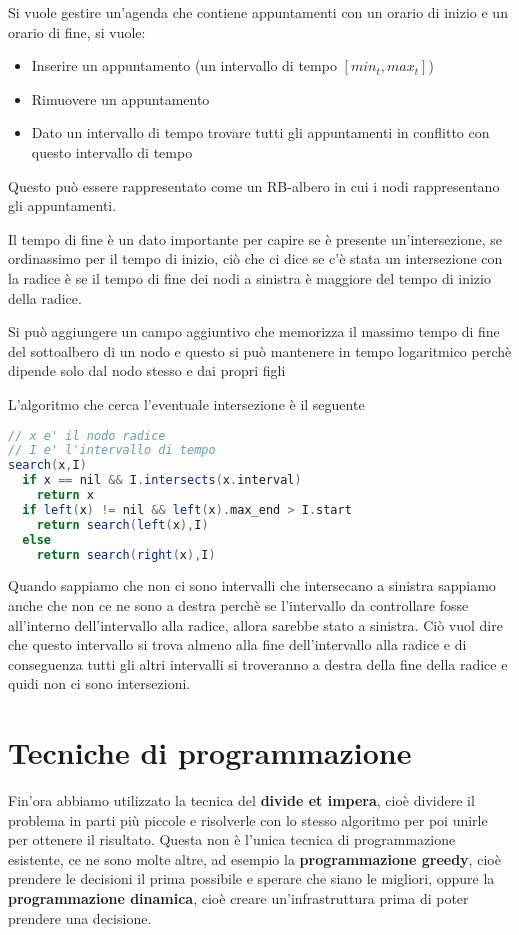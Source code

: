 \documentclass[a4paper]{article}
\begin{document}
\begin{exercise}
  Si vuole gestire un'agenda che contiene appuntamenti con un orario di inizio e un orario
  di fine, si vuole:
  \begin{itemize}
    \item Inserire un appuntamento (un intervallo di tempo \( \left[ min_t, max_t \right] \))
    \item Rimuovere un appuntamento
    \item Dato un intervallo di tempo trovare tutti gli appuntamenti in conflitto con
      questo intervallo di tempo 
  \end{itemize}
  Questo può essere rappresentato come un RB-albero in cui i nodi rappresentano gli
  appuntamenti.

  \vspace{1em}
  \noindent
  Il tempo di fine è un dato importante per capire se è presente un'intersezione,
  se ordinassimo per il tempo di inizio, ciò che ci dice se c'è stata un intersezione
  con la radice è se il tempo di fine dei nodi a sinistra è maggiore del tempo di 
  inizio della radice.

  \vspace{1em}
  \noindent
  Si può aggiungere un campo aggiuntivo che memorizza il massimo tempo di fine del
  sottoalbero di un nodo
  e questo si può mantenere in tempo logaritmico perchè dipende solo dal nodo stesso
  e dai propri figli

  \vspace{1em}
  \noindent
  L'algoritmo che cerca l'eventuale intersezione è il seguente
\begin{lstlisting}[language=Scala]
// x e' il nodo radice
// I e' l'intervallo di tempo
search(x,I)
  if x == nil && I.intersects(x.interval)
    return x
  if left(x) != nil && left(x).max_end > I.start
    return search(left(x),I)
  else
    return search(right(x),I)
\end{lstlisting}
  Quando sappiamo che non ci sono intervalli che intersecano a sinistra sappiamo
  anche che non ce ne sono a destra perchè se l'intervallo da controllare fosse
  all'interno dell'intervallo alla radice, allora sarebbe stato a sinistra.
  Ciò vuol dire che questo intervallo si trova almeno alla fine dell'intervallo alla
  radice e di conseguenza tutti gli altri intervalli si troveranno a destra della fine
  della radice e quidi non ci sono intersezioni.
\end{exercise}

\section{Tecniche di programmazione}
Fin'ora abbiamo utilizzato la tecnica del \textbf{divide et impera}, cioè dividere
il problema in parti più piccole e risolverle con lo stesso algoritmo per poi unirle
per ottenere il risultato. Questa non è l'unica tecnica di programmazione esistente,
ce ne sono molte altre, ad esempio la \textbf{programmazione greedy}, cioè prendere
le decisioni il prima possibile e sperare che siano le migliori, oppure la
\textbf{programmazione dinamica}, cioè creare un'infrastruttura prima di poter 
prendere una decisione.
\end{document}
